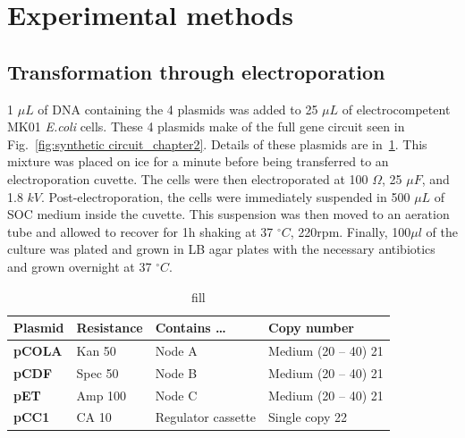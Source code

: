 


\section{Experimental methods}
\subsection{Transformation through electroporation}\label{electroporation}
1 $\mu L$ of DNA containing the 4 plasmids was added to 25 $\mu L$ of electrocompetent MK01 \textit{E.coli} cells.
These 4 plasmids make of the full gene circuit seen in Fig.~\ref{fig:synthetic circuit_chapter2}.
Details of these plasmids are in~\ref{tab:plasmid table}.
This mixture was placed on ice for a minute before being transferred to an electroporation cuvette.
The cells were then electroporated at 100 $\Omega$, 25 $\mu F$, and 1.8 $kV$.
Post-electroporation, the cells were immediately suspended in 500 $\mu L$ of SOC medium inside the cuvette.
This suspension was then moved to an aeration tube and allowed to recover for 1h shaking at 37 $^{\circ} C$, 220rpm.
Finally, 100$\mu l$ of the culture was plated and grown in LB agar plates with the necessary antibiotics and grown overnight at 37 $^{\circ} C$.

\begin{table}[H]
    \centering
    \begin{tabular}{llll}
        \toprule
        \textbf{Plasmid} & \textbf{Resistance} & \textbf{Contains …} & \textbf{Copy number} \\
        \midrule
        \textbf{pCOLA} & Kan 50 & Node A & Medium (20 – 40) 21 \\
        \textbf{pCDF} & Spec 50 & Node B & Medium (20 – 40) 21 \\
        \textbf{pET} & Amp 100 & Node C & Medium (20 – 40) 21 \\
        \textbf{pCC1} & CA 10 & Regulator cassette & Single copy 22 \\
        \bottomrule
    \end{tabular}
    \caption{fill}
    \label{tab:plasmid table}
\end{table}


